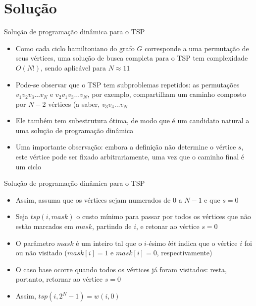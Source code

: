 \section{Solução}

\begin{frame}[fragile]{Solução de programação dinâmica para o TSP}

    \begin{itemize}
        \item Como cada ciclo hamiltoniano do grafo $G$ corresponde a uma permutação de seus
            vértices, uma solução de busca completa para o TSP tem complexidade $O(N!)$, sendo
            aplicável para $N\approx 11$

        \item Pode-se observar que o TSP tem subproblemas repetidos: as permutações 
            $v_1v_2v_3\ldots v_N$ e $v_2v_1v_3\ldots v_N$, por exemplo, compartilham um caminho
            composto por $N - 2$ vértices (a saber, $v_3v_4\ldots v_N$

        \item Ele também tem subestrutura ótima, de modo que é um candidato natural a uma solução
            de programação dinâmica

        \item Uma importante observação: embora a definição não determine o vértice $s$, 
            este vértice pode ser fixado arbitrariamente, uma vez que o caminho final é um
            ciclo
    \end{itemize}

\end{frame}

\begin{frame}[fragile]{Solução de programação dinâmica para o TSP}

    \begin{itemize}
        \item Assim, assuma que os vértices sejam numerados de $0$ a $N - 1$ e que $s = 0$

        \item Seja $tsp(i, mask)$ o custo mínimo para passar por todos os vértices que não
            estão marcados em $mask$, partindo de $i$, e retonar ao vértice $s = 0$

        \item O parâmetro $mask$ é um inteiro tal que o $i$-ésimo $bit$ indica que o vértice $i$
            foi ou não visitado ($mask[i] = 1$ e $mask[i] = 0$, respectivamente)

        \item O caso base ocorre quando todos os vértices já foram visitados: resta, portanto,
            retornar ao vértice $s = 0$

        \item Assim, $tsp(i, 2^N - 1) = w(i, 0)$
    \end{itemize}

\end{frame}

